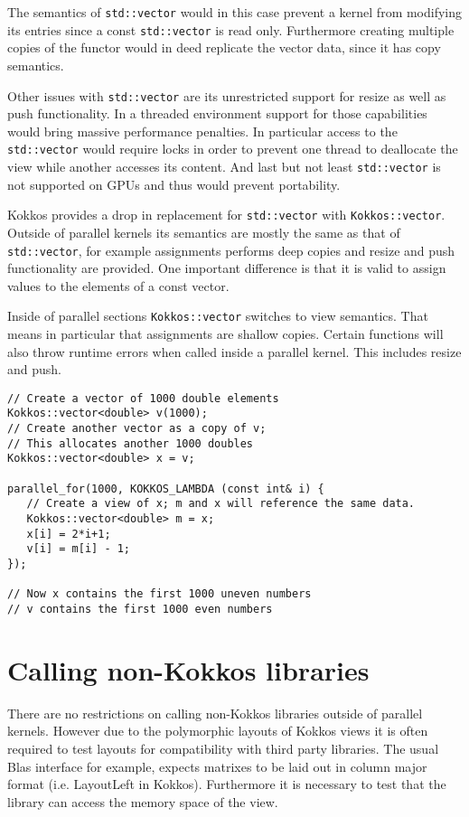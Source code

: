 The semantics of \lstinline|std::vector| would in this case prevent a kernel from modifying its 
entries since a const \lstinline|std::vector| is read only. Furthermore creating multiple copies
of the functor would in deed replicate the vector data, since it has copy semantics.

Other issues with \lstinline|std::vector| are its unrestricted support for resize as well as push 
functionality. In a threaded environment support for those capabilities would bring
massive performance penalties. In particular access to the \lstinline|std::vector| would require
locks in order to prevent one thread to deallocate the view while another accesses its content.
And last but not least \lstinline|std::vector| is not supported on GPUs and thus would prevent
portability. 
 
Kokkos provides a drop in replacement for \lstinline|std::vector| with \lstinline|Kokkos::vector|.
Outside of parallel kernels its semantics are mostly the same as that of \lstinline|std::vector|, for
example assignments performs deep copies and resize and push functionality are provided.
One important difference is that it is valid to assign values to the elements of a const vector.

Inside of parallel sections \lstinline|Kokkos::vector| switches to view semantics. That means
in particular that assignments are shallow copies. Certain functions will also throw runtime 
errors when called inside a parallel kernel. This includes resize and push. 

\begin{lstlisting}
// Create a vector of 1000 double elements
Kokkos::vector<double> v(1000);
// Create another vector as a copy of v; 
// This allocates another 1000 doubles
Kokkos::vector<double> x = v; 

parallel_for(1000, KOKKOS_LAMBDA (const int& i) {
   // Create a view of x; m and x will reference the same data.
   Kokkos::vector<double> m = x; 
   x[i] = 2*i+1;
   v[i] = m[i] - 1;
});

// Now x contains the first 1000 uneven numbers
// v contains the first 1000 even numbers
\end{lstlisting}

\section{Calling non-Kokkos libraries}

There are no restrictions on calling non-Kokkos libraries outside of parallel kernels. 
However due to the polymorphic layouts of Kokkos views it is often required to test
layouts for compatibility with third party libraries. The usual Blas interface for example,
expects matrixes to be laid out in column major format (i.e. LayoutLeft in Kokkos). 
Furthermore it is necessary to test that the library can access the memory space 
of the view.

